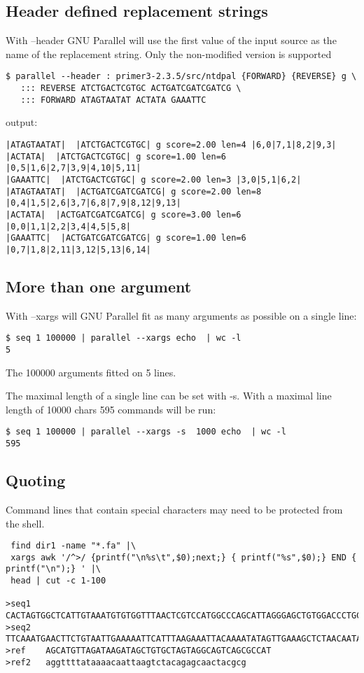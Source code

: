 \documentclass{article}
\begin{document}
\subsection{Header defined replacement strings}
With --header GNU Parallel will use the first value of the input source as the name of the replacement string. Only the non-modified version {} is supported
\begin{lstlisting}
$ parallel --header : primer3-2.3.5/src/ntdpal {FORWARD} {REVERSE} g \
   ::: REVERSE ATCTGACTCGTGC ACTGATCGATCGATCG \
   ::: FORWARD ATAGTAATAT ACTATA GAAATTC
\end{lstlisting}
output:
\begin{lstlisting}
|ATAGTAATAT|  |ATCTGACTCGTGC| g score=2.00 len=4 |6,0|7,1|8,2|9,3|
|ACTATA|  |ATCTGACTCGTGC| g score=1.00 len=6 |0,5|1,6|2,7|3,9|4,10|5,11|
|GAAATTC|  |ATCTGACTCGTGC| g score=2.00 len=3 |3,0|5,1|6,2|
|ATAGTAATAT|  |ACTGATCGATCGATCG| g score=2.00 len=8 |0,4|1,5|2,6|3,7|6,8|7,9|8,12|9,13|
|ACTATA|  |ACTGATCGATCGATCG| g score=3.00 len=6 |0,0|1,1|2,2|3,4|4,5|5,8|
|GAAATTC|  |ACTGATCGATCGATCG| g score=1.00 len=6 |0,7|1,8|2,11|3,12|5,13|6,14|
\end{lstlisting}

\subsection{More than one argument}
With --xargs will GNU Parallel fit as many arguments as possible on a single line:
\begin{lstlisting}
$ seq 1 100000 | parallel --xargs echo  | wc -l
5
\end{lstlisting}
The 100000 arguments fitted on 5 lines.

The maximal length of a single line can be set with -s. With a maximal line length of 10000 chars 595 commands will be run:
\begin{lstlisting}
$ seq 1 100000 | parallel --xargs -s  1000 echo  | wc -l
595
\end{lstlisting}

\subsection{Quoting}
Command lines that contain special characters may need to be protected from the shell.
\begin{lstlisting}
 find dir1 -name "*.fa" |\
 xargs awk '/^>/ {printf("\n%s\t",$0);next;} { printf("%s",$0);} END { printf("\n");} ' |\
 head | cut -c 1-100

>seq1	CACTAGTGGCTCATTGTAAATGTGTGGTTTAACTCGTCCATGGCCCAGCATTAGGGAGCTGTGGACCCTGCAGCCTGGCTGTGGGGGCCGCAGT
>seq2	TTCAAATGAACTTCTGTAATTGAAAAATTCATTTAAGAAATTACAAAATATAGTTGAAAGCTCTAACAATAGACTAAACCAAGCAGAAGAAAGA
>ref	AGCATGTTAGATAAGATAGCTGTGCTAGTAGGCAGTCAGCGCCAT
>ref2	aggttttataaaacaattaagtctacagagcaactacgcg
\end{lstlisting}
\end{document}
